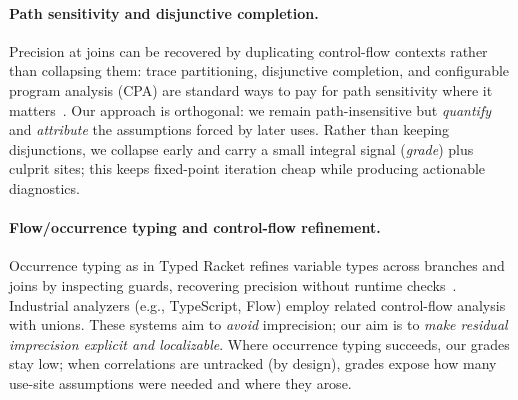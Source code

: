 \paragraph{Path sensitivity and disjunctive completion.}
Precision at joins can be recovered by duplicating control-flow contexts rather than collapsing them: 
trace partitioning, disjunctive completion, and configurable program analysis (CPA) are standard ways to pay for path sensitivity where it matters~\cite{MauborgneRival2005,BeyerHenzinger2007}.
Our approach is orthogonal: we remain path-insensitive but \emph{quantify} and \emph{attribute} the assumptions forced by later uses.
Rather than keeping disjunctions, we collapse early and carry a small integral signal (\emph{grade}) plus culprit sites; this keeps fixed-point iteration cheap while producing actionable diagnostics.

\paragraph{Flow/occurrence typing and control-flow refinement.}
Occurrence typing as in Typed Racket refines variable types across branches and joins by inspecting guards, recovering precision without runtime checks~\cite{TobinHochstadtFelleisen2008}.
Industrial analyzers (e.g., TypeScript, Flow) employ related control-flow analysis with unions.
These systems aim to \emph{avoid} imprecision; our aim is to \emph{make residual imprecision explicit and localizable}.
Where occurrence typing succeeds, our grades stay low; when correlations are untracked (by design), grades expose how many use-site assumptions were needed and where they arose.